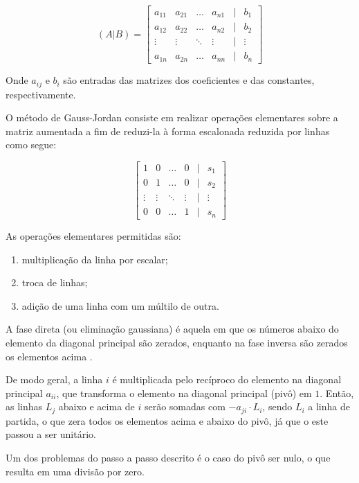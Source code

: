 \documentclass[twocolumn, 10pt,a4paper]{extarticle}
\begin{document}
\[ 
(A\vert B) = 
\begin{bmatrix}
a_{11} & a_{21} & \dots & a_{n1} & \vert & b_1 \\
a_{12} & a_{22} & \dots & a_{n2} & \vert & b_2 \\
\vdots & \vdots & \ddots & \vdots & \vert & \vdots \\
a_{1n} & a_{2n} & \dots & a_{nn} & \vert & b_n

\end{bmatrix}
\]

Onde $a_{ij}$ e $b_i$ são entradas das matrizes dos coeficientes e das constantes, respectivamente.

O método de Gauss-Jordan consiste em realizar operações elementares sobre a matriz aumentada a fim de reduzi-la à forma escalonada reduzida por linhas \cite[p. 15]{antonAlgebra} como segue:

\[ 
\begin{bmatrix}
1 & 0 & \dots & 0 & \vert & s_1 \\
0 & 1 & \dots & 0 & \vert & s_2 \\
\vdots & \vdots & \ddots & \vdots & \vert & \vdots \\
0 & 0 & \dots & 1 & \vert & s_n
\end{bmatrix}
\]

As operações elementares permitidas são:

\begin{enumerate}
    \item multiplicação da linha por escalar;
    \item troca de linhas;
    \item adição de uma linha com um múltilo de outra.
\end{enumerate}

A fase direta (ou eliminação gaussiana) é aquela em que os números abaixo do elemento da diagonal principal são zerados, enquanto na fase inversa são zerados os elementos acima \cite[p.15]{antonAlgebra}.

De modo geral, a linha $i$ é multiplicada pelo recíproco do elemento na diagonal principal $a_{ii}$, que transforma o elemento na diagonal principal (pivô) em $1$. Então, as linhas $L_j$ abaixo e acima de $i$ serão somadas com $-a_{ji}\cdot L_i$, sendo $L_i$ a linha de partida, o que zera todos os elementos acima e abaixo do pivô, já que o este passou a ser unitário.

Um dos problemas do passo a passo descrito é o caso do pivô ser nulo, o que resulta em uma divisão por zero. 
\end{document}
